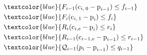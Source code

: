 \begin{align}
                                    \quad & \quad \quad \textcolor{blue}{F_{i-1} (\mbox{c}_{i,\:0}-\mbox{p}_{i-1}) \leq  f_{i-1}} \nonumber\\
                                    \quad & \quad \quad \textcolor{blue}{F_{i} (\mbox{c}_{i,\:1}-\mbox{p}_{i}) \leq  f_{i}}  \nonumber\\
                                    \quad & \quad \quad \textcolor{blue}{R_{i} (\mbox{c}_{i,e} - \mbox{p}_{i}) \leq r_i}  \nonumber\\
                                    \quad & \quad \quad \textcolor{blue}{R_{i-1} (\mbox{c}_{i-1,e} - \mbox{p}_{i-1}) \leq r_{i-1}} \nonumber\\
                                    \quad & \quad \quad \textcolor{blue}{\mathcal{Q}_{i-1} (p_i - \mbox{p}_{i-1}) \leq q_{i-1}} \nonumber
\end{align}
